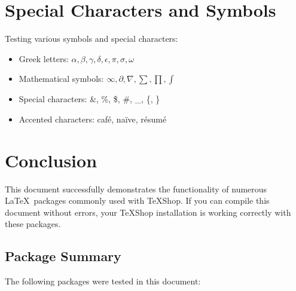 \documentclass[12pt,a4paper]{article}
\begin{document}
\section{Special Characters and Symbols}

Testing various symbols and special characters:

\begin{itemize}
    \item Greek letters: $\alpha, \beta, \gamma, \delta, \epsilon, \pi, \sigma, \omega$
    \item Mathematical symbols: $\infty, \partial, \nabla, \sum, \prod, \int$
    \item Special characters: \&, \%, \$, \#, \_, \{, \}
    \item Accented characters: caf\'e, na\"ive, r\'esum\'e
\end{itemize}

\section{Conclusion}

This document successfully demonstrates the functionality of numerous \LaTeX\ packages commonly used with TeXShop. If you can compile this document without errors, your TeXShop installation is working correctly with these packages.

\subsection{Package Summary}

The following packages were tested in this document:
\end{document}
